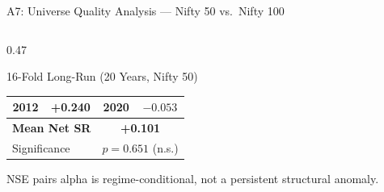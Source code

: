 \documentclass[aspectratio=169,10pt]{beamer}
\begin{document}
\begin{frame}{A7: Universe Quality Analysis --- Nifty 50 vs.\ Nifty 100}
\begin{columns}[T]
\begin{column}{0.47\textwidth}
\begin{block}{16-Fold Long-Run (20 Years, Nifty 50)}
\begin{tabular}{cc|cc}
          2012 & +0.240 & 2020 & $-0.053$ \\
          \midrule
          \multicolumn{2}{l}{\textbf{Mean Net SR}} & \multicolumn{2}{c}{\textbf{+0.101}} \\
          \multicolumn{2}{l}{Significance} & \multicolumn{2}{c}{$p = 0.651$ (n.s.)} \\
          \bottomrule
        \end{tabular}
      \end{block}
      \vspace{3pt}
      \small NSE pairs alpha is \alert{regime-conditional}, not a persistent structural anomaly.
    \end{column}
  \end{columns}
\end{frame}

\setcounter{framenumber}{\value{finalframe}}
\end{document}
